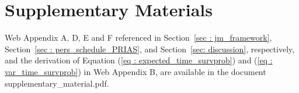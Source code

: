 \documentclass[useAMS, usenatbib]{biom}
\begin{document}
\backmatter





\section*{Supplementary Materials}

Web Appendix A, D, E and F referenced in Section~\ref{sec : jm_framework},  Section~\ref{sec : pers_schedule_PRIAS},  and  Section~\ref{sec: discussion}, respectively, and the derivation of Equation (\ref{eq : expected_time_survprob}) and (\ref{eq : var_time_survprob}) in Web Appendix B, are available in the document supplementary\_material.pdf.\vspace*{-8pt}



%
%   
% 

 

\end{document}
